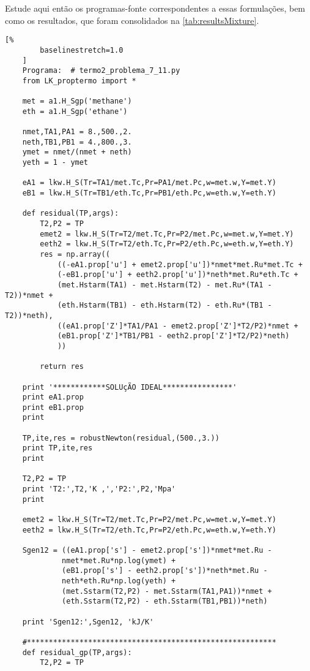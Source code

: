     Estude aqui então os programas-fonte correspondentes a essas formulações,
    bem como os resultados, que foram consolidados na
    \cref{tab:resultsMixture}.

    \begin{Verbatim}[%
        baselinestretch=1.0
    ]
    Programa:  # termo2_problema_7_11.py
    from LK_proptermo import *

    met = a1.H_Sgp('methane')
    eth = a1.H_Sgp('ethane')

    nmet,TA1,PA1 = 8.,500.,2.
    neth,TB1,PB1 = 4.,800.,3.
    ymet = nmet/(nmet + neth)
    yeth = 1 - ymet

    eA1 = lkw.H_S(Tr=TA1/met.Tc,Pr=PA1/met.Pc,w=met.w,Y=met.Y)
    eB1 = lkw.H_S(Tr=TB1/eth.Tc,Pr=PB1/eth.Pc,w=eth.w,Y=eth.Y)

    def residual(TP,args):
        T2,P2 = TP
        emet2 = lkw.H_S(Tr=T2/met.Tc,Pr=P2/met.Pc,w=met.w,Y=met.Y)
        eeth2 = lkw.H_S(Tr=T2/eth.Tc,Pr=P2/eth.Pc,w=eth.w,Y=eth.Y)
        res = np.array((
            ((-eA1.prop['u'] + emet2.prop['u'])*nmet*met.Ru*met.Tc +
            (-eB1.prop['u'] + eeth2.prop['u'])*neth*met.Ru*eth.Tc +
            (met.Hstarm(TA1) - met.Hstarm(T2) - met.Ru*(TA1 - T2))*nmet +
            (eth.Hstarm(TB1) - eth.Hstarm(T2) - eth.Ru*(TB1 - T2))*neth),
            ((eA1.prop['Z']*TA1/PA1 - emet2.prop['Z']*T2/P2)*nmet +
            (eB1.prop['Z']*TB1/PB1 - eeth2.prop['Z']*T2/P2)*neth)
            ))

        return res

    print '************SOLUçÃO IDEAL****************'
    print eA1.prop
    print eB1.prop
    print

    TP,ite,res = robustNewton(residual,(500.,3.))
    print TP,ite,res
    print

    T2,P2 = TP
    print 'T2:',T2,'K ,','P2:',P2,'Mpa'
    print

    emet2 = lkw.H_S(Tr=T2/met.Tc,Pr=P2/met.Pc,w=met.w,Y=met.Y)
    eeth2 = lkw.H_S(Tr=T2/eth.Tc,Pr=P2/eth.Pc,w=eth.w,Y=eth.Y)

    Sgen12 = ((eA1.prop['s'] - emet2.prop['s'])*nmet*met.Ru -
             nmet*met.Ru*np.log(ymet) +
             (eB1.prop['s'] - eeth2.prop['s'])*neth*met.Ru -
             neth*eth.Ru*np.log(yeth) +
             (met.Sstarm(T2,P2) - met.Sstarm(TA1,PA1))*nmet +
             (eth.Sstarm(T2,P2) - eth.Sstarm(TB1,PB1))*neth)

    print 'Sgen12:',Sgen12, 'kJ/K'

    #*********************************************************
    def residual_gp(TP,args):
        T2,P2 = TP


\end{Verbatim}
